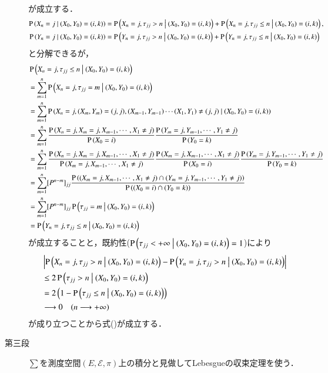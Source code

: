 \begin{prf}
\begin{description}
\begin{align}
		\end{align}
		が成立する．
		\begin{align}
			\operatorname{P} \left( X_n=j \ \middle|\ (X_0,Y_0)=(i,k) \right) &= \operatorname{P} \left( X_n=j, \tau_{jj} > n \ \middle|\ (X_0,Y_0)=(i,k) \right) + \operatorname{P} \left( X_n=j, \tau_{jj} \leq n \ \middle|\ (X_0,Y_0)=(i,k) \right), \\
			\operatorname{P} \left( Y_n=j \ \middle|\ (X_0,Y_0)=(i,k) \right) &= \operatorname{P} \left( Y_n=j, \tau_{jj} > n \ \middle|\ (X_0,Y_0)=(i,k) \right) + \operatorname{P} \left( Y_n=j, \tau_{jj} \leq n \ \middle|\ (X_0,Y_0)=(i,k) \right)
		\end{align}
		と分解できるが，
		\begin{align}
			&\operatorname{P} \left( X_n=j, \tau_{jj} \leq n \ \middle|\ (X_0,Y_0)=(i,k) \right) \\
			&= \sum_{m=1}^{n} \operatorname{P} \left( X_n=j, \tau_{jj} = m \ \middle|\ (X_0,Y_0)=(i,k) \right) \\
			&= \sum_{m=1}^{n} \operatorname{P} \left( X_n=j, (X_m,Y_m)=(j,j), (X_{m-1},Y_{m-1}) \cdots (X_1,Y_1) \neq (j,j) \ \middle|\ (X_0,Y_0)=(i,k) \right) \\
			&= \sum_{m=1}^{n} \frac{\operatorname{P} \left(X_n=j,X_m=j,X_{m-1},\cdots,X_1 \neq j\right)}{\operatorname{P} \left(X_0=i\right)}
				\frac{\operatorname{P} \left(Y_m=j,Y_{m-1},\cdots,Y_1 \neq j\right)}{\operatorname{P} \left(Y_0=k\right)} \\
			&= \sum_{m=1}^{n} \frac{\operatorname{P} \left(X_n=j,X_m=j,X_{m-1},\cdots,X_1 \neq j\right)}{\operatorname{P} \left(X_m=j,X_{m-1},\cdots,X_1 \neq j\right)}
				\frac{\operatorname{P} \left(X_m=j,X_{m-1},\cdots,X_1 \neq j\right)}{\operatorname{P} \left(X_0=i\right)}\frac{\operatorname{P} \left(Y_m=j,Y_{m-1},\cdots,Y_1 \neq j\right)}{\operatorname{P} \left(Y_0=k\right)} \\
			&= \sum_{m=1}^{n} [P^{n-m}]_{jj} \frac{\operatorname{P} \left((X_m=j,X_{m-1},\cdots,X_1 \neq j)\cap(Y_m=j,Y_{m-1},\cdots,Y_1 \neq j)\right)}{\operatorname{P} \left((X_0=i)\cap(Y_0=k)\right)} \\
			&= \sum_{m=1}^{n} [P^{n-m}]_{jj} \operatorname{P} \left( \tau_{jj} = m \ \middle|\ (X_0,Y_0)=(i,k) \right) \\
			&= \operatorname{P} \left( Y_n=j, \tau_{jj} \leq n \ \middle|\ (X_0,Y_0)=(i,k) \right)
		\end{align}
		が成立することと，既約性($\operatorname{P} \left( \tau_{jj} < +\infty \ \middle|\ (X_0,Y_0)=(i,k) \right) = 1$)により
		\begin{align}
			&\left| \operatorname{P} \left( X_n=j, \tau_{jj} > n \ \middle|\ (X_0,Y_0)=(i,k) \right) - \operatorname{P} \left( Y_n=j, \tau_{jj} > n \ \middle|\ (X_0,Y_0)=(i,k) \right) \right| \\
			&\leq 2\operatorname{P} \left( \tau_{jj} > n \ \middle|\ (X_0,Y_0)=(i,k) \right) \\
			&= 2 \left( 1 - \operatorname{P} \left( \tau_{jj} \leq n \ \middle|\ (X_0,Y_0)=(i,k) \right) \right) \\
			&\longrightarrow 0 \quad (n \longrightarrow +\infty)
		\end{align}
		が成り立つことから式()が成立する．
	\item[第三段]
		$\sum$を測度空間$(E,\mathcal{E},\pi)$上の積分と見做してLebesgueの収束定理を使う．

\end{description}
\end{prf}
